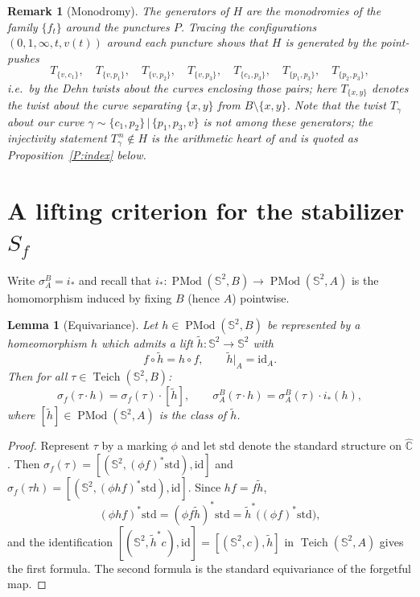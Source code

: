 \documentclass[11pt]{amsart}
\newtheorem{lemma}[theorem]{Lemma}
\newtheorem{remark}[theorem]{Remark}
\newcommand{\Sph}{\mathbb{S}^{2}}
\newcommand{\Cpt}{\widehat{\mathbb{C}}}
\newcommand{\Teich}{\operatorname{Teich}}
\newcommand{\PMod}{\operatorname{PMod}}
\begin{document}
\begin{remark}[Monodromy]\label{R:monodromy}
The generators of $H$ are the monodromies of the family $\{f_t\}$ around
the punctures $P$. Tracing the configurations $(0,1,\infty,t,v(t))$ around
each puncture shows that $H$ is generated by the point-pushes
\[
T_{\{v,c_1\}},\quad T_{\{v,p_1\}},\quad T_{\{v,p_2\}},\quad T_{\{v,p_3\}},
\quad T_{\{c_1,p_3\}},\quad T_{\{p_1,p_3\}},\quad T_{\{p_2,p_3\}},
\]
i.e.\ by the Dehn twists about the curves enclosing those pairs; here
$T_{\{x,y\}}$ denotes the twist about the curve separating $\{x,y\}$ from
$B\setminus\{x,y\}$. Note that the twist $T_\gamma$ about our curve
$\gamma\sim \{c_1,p_2\}\,|\,\{p_1,p_3,v\}$ is \emph{not} among these
generators; the injectivity statement $T_\gamma^{\,n}\notin H$ is the
arithmetic heart of \cite{Luo} and is quoted as
Proposition~\ref{P:index} below.
\end{remark}

\section{A lifting criterion for the stabilizer $S_f$}\label{S:lift}

Write $\sigma^B_A=i_*$ and recall that $i_*:\PMod(\Sph,B)\to\PMod(\Sph,A)$
is the homomorphism induced by fixing $B$ (hence $A$) pointwise.

\begin{lemma}[Equivariance]\label{L:equiv}
Let $h\in\PMod(\Sph,B)$ be represented by a homeomorphism $h$ which admits
a lift $\tilde h:\Sph\to\Sph$ with
\[
f\circ\tilde h=h\circ f,\qquad \tilde h|_A=\mathrm{id}_{A}.
\]
Then for all $\tau\in\Teich(\Sph,B)$:
\[
\sigma_f(\tau\cdot h)=\sigma_f(\tau)\cdot[\tilde h],
\qquad
\sigma^B_A(\tau\cdot h)=\sigma^B_A(\tau)\cdot i_*(h),
\]
where $[\tilde h]\in\PMod(\Sph,A)$ is the class of $\tilde h$.
\end{lemma}

\begin{proof}
Represent $\tau$ by a marking $\phi$ and let $\mathrm{std}$ denote the
standard structure on $\Cpt$. Then
$\sigma_f(\tau)=[(\Sph,(\phi f)^*\mathrm{std}),\mathrm{id}]$ and
$\sigma_f(\tau h)=[(\Sph,(\phi hf)^*\mathrm{std}),\mathrm{id}]$. Since
$hf=f\tilde h$,
\[
(\phi hf)^*\mathrm{std}=(\phi f\tilde h)^*\mathrm{std}
=\tilde h^*\bigl((\phi f)^*\mathrm{std}\bigr),
\]
and the identification
$[(\Sph,\tilde h^* c),\mathrm{id}]=[(\Sph,c),\tilde h]$ in
$\Teich(\Sph,A)$ gives the first formula. The second formula is the
standard equivariance of the forgetful map.
\end{proof}
\end{document}
